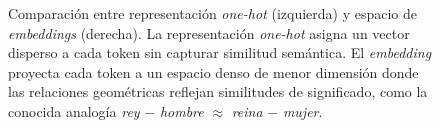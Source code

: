 \begin{figure}[H]
\begin{minipage}{0.50\textwidth}
\end{minipage}

\caption{Comparación entre representación \textit{one-hot} (izquierda) y
espacio de \textit{embeddings} (derecha). La representación \textit{one-hot}
asigna un vector disperso a cada token sin capturar similitud semántica.
El \textit{embedding} proyecta cada token a un espacio denso de menor
dimensión donde las relaciones geométricas reflejan similitudes de
significado, como la conocida analogía \textit{rey} $-$ \textit{hombre}
$\approx$ \textit{reina} $-$ \textit{mujer}.}
\label{fig:embeddings}
\end{figure}
